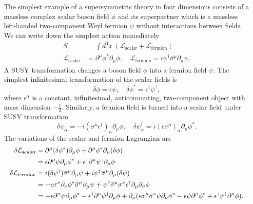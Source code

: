 \documentclass[12pt]{report}
\begin{document}
The simplest example of a supersymmetric theory in four dimensions consists of a massless complex scalar boson field $\phi$ and its superpartner which is a massless left-handed two-component Weyl fermion $\psi$ without interactions between fields.
We can write down the simplest action immediately
\begin{align}
S &= \int d^{4} x \ (\mathcal{L}_{\mathrm{scalar}} + \mathcal{L}_{\mathrm{fermion}})\\
\mathcal{L}_{\mathrm{scalar}} &= \partial^{\mu} \phi^{*} \partial_{\mu} \phi, \quad \mathcal{L}_{\mathrm{fermion}} = i \psi^{\dag} \overline{\sigma}^{\mu} \partial_{\mu} \psi .
\end{align}
A SUSY transformation changes a boson field $\phi$ into a fermion field $\psi$.
The simplest infinitesimal transformation of the scalar fields is
\begin{equation} \label{eq: susy transformation for boson fields}
\delta \phi  = \epsilon \psi, \quad \delta \phi^{*} = \epsilon^{\dag} \psi^{\dag} ,
\end{equation}
where $\epsilon^{\alpha}$ is a constant, infinitesimal, anticommuting, two-component object with mass dimension $-\frac{1}{2}$.
Similarly, a fermion field is turned into a scalar field under SUSY transformation
\begin{equation} \label{eq: susy transformation for fermion fields}
\delta \psi_{\alpha} = -i (\sigma^{\mu} \epsilon^{\dag})_{\alpha} \partial_{\mu} \phi, \quad \delta \psi^{\dag}_{\dot{\alpha}} = i (\epsilon \sigma^{\mu})_{\dot{\alpha}} \partial_{\mu} \phi^{*} .
\end{equation}
The variations of the scalar and fermion Lagrangian are
\begin{align}
\delta \mathcal{L}_{\mathrm{scalar}} &= \partial^{\mu} (\delta \phi^{*}) \partial_{\mu} \phi + \partial^{\mu} \phi^{*} \partial_{\mu} (\delta \phi) \notag \\
&= \epsilon \partial^{\mu} \psi \partial_{\mu} \phi^{*} + \epsilon^{\dag} \partial^{\mu} \psi^{\dag} \partial_{\mu} \phi\\
%
\delta \mathcal{L}_{\mathrm{fermion}} &= i (\delta \psi^{\dag}) \overline{\sigma}^{\mu} \partial_{\mu} \psi + i \psi^{\dag} \overline{\sigma}^{\mu} \partial_{\mu} (\delta \psi) \notag \\
&= -\epsilon \sigma^{\nu} \partial_{\nu} \phi^{*} \overline{\sigma}^{\mu} \partial_{\mu} \psi + \psi^{\dag} \overline{\sigma}^{\mu} \sigma^{\nu} \epsilon^{\dag} \partial_{\mu} \partial_{\nu} \phi \notag \\
&= -\epsilon \partial^{\mu} \psi \partial_{\mu} \phi^{*} - \epsilon^{\dag} \partial^{\mu} \psi^{\dag} \partial_{\mu} \phi
+\partial_{\mu} (\epsilon \sigma^{\mu} \overline{\sigma}^{\nu} \psi \partial_{\nu} \phi^{*} - \epsilon \psi \partial^{\mu} \phi^{*} + \epsilon^{\dag} \psi^{\dag} \partial^{\mu}\phi) .
\end{align}
\end{document}
